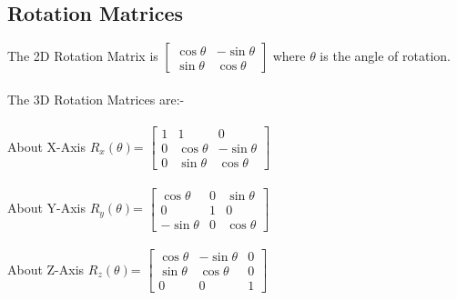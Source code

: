 \documentclass[14pt]{article}
\begin{document}
	\subsection{Rotation Matrices}
	\large{
		The 2D Rotation Matrix is $\begin{bmatrix}
		\cos\theta & -\sin\theta\\
		\sin\theta & \cos\theta
		\end{bmatrix}$ where $\theta$ is the angle of rotation.
		\\ \\ The 3D Rotation Matrices are:-
		\\ \\ About X-Axis $R_x(\theta)$= $\displaystyle \begin{bmatrix}
		1 & 1 & 0\\
		0 & \cos\theta & -\sin\theta\\
		0 & \sin\theta & \cos\theta
		\end{bmatrix}$
		\\ \\ About Y-Axis $R_y(\theta)$= $\displaystyle \begin{bmatrix}
		\cos\theta & 0 & \sin\theta\\
		0 & 1 & 0\\
		-\sin\theta & 0 & \cos\theta
		\end{bmatrix}$
		\\ \\ About Z-Axis $R_z(\theta)$= $\displaystyle \begin{bmatrix}
		\cos\theta & -\sin\theta & 0\\
		\sin\theta & \cos\theta & 0\\
		0 & 0 & 1
		\end{bmatrix}$}
\end{document}
